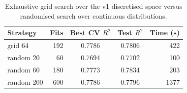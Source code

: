 \begin{table}[htbp]
\centering
\caption{Exhaustive grid search over the v1 discretised space versus randomised search over continuous distributions.}\label{tab:search}
\small
\begin{tabular}{lrccr}
\toprule
Strategy & Fits & Best CV $R^2$ & Test $R^2$ & Time (s) \\
\midrule
grid 64 & 192 & 0.7786 & 0.7806 & 422 \\
random 20 & 60 & 0.7694 & 0.7702 & 100 \\
random 60 & 180 & 0.7773 & 0.7834 & 203 \\
random 200 & 600 & 0.7786 & 0.7796 & 1377 \\
\bottomrule
\end{tabular}
\end{table}